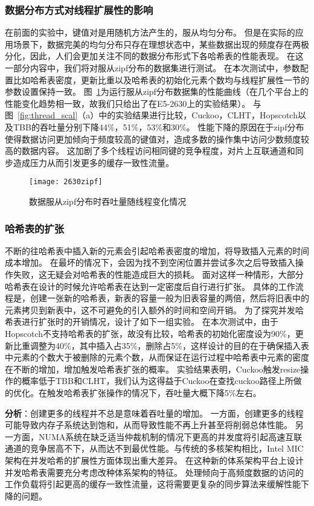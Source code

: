 \subsubsection{数据分布方式对线程扩展性的影响}
在前面的实验中，键值对是用随机方法产生的，服从均匀分布。
但是在实际的应用场景下，数据完美的均匀分布只存在理想状态中，某些数据出现的频度存在两极分化，因此，人们会更加关注不同的数据分布形式下各哈希表的性能表现。
在这一部分内容中，我们将对服从zipf分布的数据集进行测试。
在本次测试中，参数配置比如哈希表密度，更新比重以及哈希表的初始化元素个数均与线程扩展性一节的参数设置保持一致。
图~\ref{fig:zipf}为运行服从zipf分布数据集的性能曲线（在几个平台上的性能变化趋势相一致，故我们只给出了在E5-2630上的实验结果）。
与图~\ref{fig:thread_scal}（a）中的实验结果进行比较，Cuckoo，CLHT，Hopscotch以及TBB的吞吐量分别下降44\%，51\%，53\%和30\%。
性能下降的原因在于zipf分布使得数据访问更加倾向于频度较高的键值对，造成多数的操作集中访问少数频度较高的数据内容。
这加剧了多个线程访问相同键的竞争程度，对片上互联通道和同步造成压力从而引发更多的缓存一致性流量。

\begin{figure}[htbp]
\centering
\texttt{[image: 2630zipf]}
\caption{数据服从zipf分布时吞吐量随线程变化情况}
\label{fig:zipf}
\end{figure}

\subsubsection{哈希表的扩张}
不断的往哈希表中插入新的元素会引起哈希表密度的增加，将导致插入元素的时间成本增加。
在最坏的情况下，会因为找不到空闲位置并尝试多次之后导致插入操作失败，这无疑会对哈希表的性能造成巨大的损耗。
面对这样一种情形，大部分哈希表在设计的时候允许哈希表在达到一定密度后自行进行扩张。
具体的工作流程是，创建一张新的哈希表，新表的容量一般为旧表容量的两倍，然后将旧表中的元素拷贝到新表中，这不可避免的引入额外的时间和空间开销。
为了探究并发哈希表进行扩张时的开销情况，设计了如下一组实验。
在本次测试中，由于Hopscotch不支持哈希表的扩张，故没有比较，哈希表的初始化密度设为90\%，更新比重调整为40\%，其中插入占35\%，删除占5\%，这样设计的目的在于确保插入表中元素的个数大于被删除的元素个数，从而保证在运行过程中哈希表中元素的密度在不断的增加，增加触发哈希表扩张的概率。
实验结果表明，Cuckoo触发resize操作的概率低于TBB和CLHT，我们认为这得益于Cuckoo在查找cuckoo路径上所做的优化。在触发哈希表扩张操作的情况下，吞吐量大概下降5\%左右。

\textbf{分析}：创建更多的线程并不总是意味着吞吐量的增加。
一方面，创建更多的线程可能导致内存子系统达到饱和，从而导致性能不再上升甚至将削弱总体性能。
另一方面，NUMA系统在缺乏适当仲裁机制的情况下更高的并发度将引起高速互联通道的竞争居高不下，从而达不到最优性能。与传统的多核架构相比，Intel MIC架构在并发哈希的扩展性方面体现出重大差异。
在这种新的体系架构平台上设计并发哈希表需要充分考虑改种体系架构的特征。
处理倾向于高频度数据的访问的工作负载将引起更高的缓存一致性流量，这将需要更复杂的同步算法来缓解性能下降的问题。

